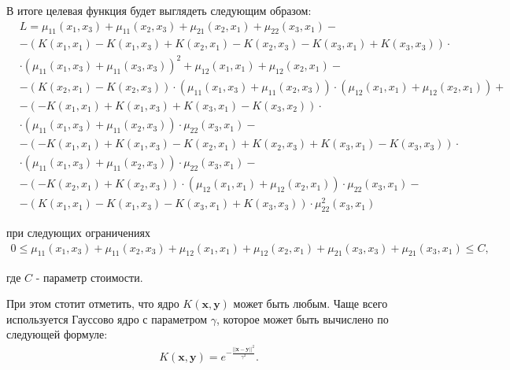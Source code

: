 \documentclass[12pt,a4paper,oneside]{article}
\begin{document}
\par
В итоге целевая функция будет выглядеть следующим образом:
\mbox{}
\begin{eqnarray*}
&L = \mu_{11}(x_1, x_3) + \mu_{11}(x_2, x_3) + \mu_{21}(x_2, x_1) + \mu_{22}(x_3, x_1) - \\
&- (K(x_1, x_1) - K(x_1, x_3) + K(x_2, x_1) - K(x_2, x_3) - K(x_3, x_1) + K(x_3, x_ 3)) \cdot \\
&\cdot (\mu_{11}(x_1, x_3) + \mu_{11}(x_3, x_3))^{2} + \mu_{12}(x_1, x_1) + \mu_{12}(x_2, x_1) - \\
&- (K(x_2, x_1) - K(x_2, x_3)) \cdot (\mu_{11}(x_1, x_3) + \mu_{11}(x_2, x_3)) \cdot (\mu_{12}(x_1, x_1) + \mu_{12}(x_2, x_1)) +\\
&- (-K(x_1, x_1) + K(x_1, x_3) + K(x_3, x_1) - K(x_3, x_2)) \cdot \\
&\cdot (\mu_{11}(x_1, x_3) + \mu_{11}(x_2, x_3)) \cdot \mu_{22}(x_3, x_1) - \\
&- (-K(x_1, x_1) + K(x_1, x_3) - K(x_2, x_1) + K(x_2, x_3) + K(x_3, x_1) - K(x_3, x_3)) \cdot \\
& \cdot (\mu_{11}(x_1, x_3) + \mu_{11}(x_2, x_3)) \cdot \mu_{22}(x_3, x_1) -\\
&- (-K(x_2, x_1) + K(x_2, x_3)) \cdot (\mu_{12}(x_1, x_1) + \mu_{12}(x_2, x_1)) \cdot \mu_{22}(x_3, x_1) - \\
&- (K(x_1, x_1) - K(x_1, x_3) - K(x_3, x_1) + K(x_3, x_3)) \cdot \mu^{2}_{22}(x_3, x_1)
\end{eqnarray*}

\par
при следующих ограничениях
\mbox{}
\begin{eqnarray*}
0 \leq \mu_{11}(x_1, x_3) + \mu_{11}(x_2, x_3) + \mu_{12}(x_1, x_1) + \mu_{12}(x_2, x_1) + \mu_{21}(x_3, x_3) + \mu_{21}(x_3, x_1) \leq C,
\end{eqnarray*}

\par
где \(C\) - параметр стоимости. 

\par
При этом стотит отметить, что ядро \(K(\mathbf{x},\mathbf{y})\) может быть любым. 
Чаще всего используется Гауссово ядро с параметром \(\gamma\), которое может быть вычислено по следующей формуле:
\mbox{}
\begin{eqnarray*}
&K(\mathbf{x}, \mathbf{y}) = e^{-\frac{||\mathbf{x}-\mathbf{y}||^2}{\gamma^{2}}}.
\end{eqnarray*}

\end{document}
